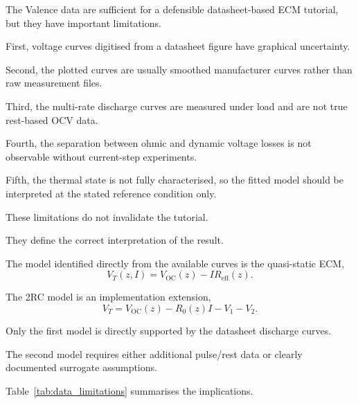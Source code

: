 \documentclass[a4paper,12pt]{article}
\begin{document}
The Valence data are sufficient for a defensible datasheet-based ECM tutorial, but they have important limitations.

First, voltage curves digitised from a datasheet figure have graphical uncertainty.

Second, the plotted curves are usually smoothed manufacturer curves rather than raw measurement files.

Third, the multi-rate discharge curves are measured under load and are not true rest-based OCV data.

Fourth, the separation between ohmic and dynamic voltage losses is not observable without current-step experiments.

Fifth, the thermal state is not fully characterised, so the fitted model should be interpreted at the stated reference condition only.

These limitations do not invalidate the tutorial.

They define the correct interpretation of the result.

The model identified directly from the available curves is the quasi-static ECM,
\begin{equation}
V_T(z,I)
=
V_{\mathrm{OC}}(z)
-
IR_{\mathrm{eff}}(z).
\label{eq:data_directly_supported_model}
\end{equation}

The 2RC model is an implementation extension,
\begin{equation}
V_T
=
V_{\mathrm{OC}}(z)
-
R_0(z)I
-
V_1
-
V_2.
\label{eq:data_surrogate_dynamic_model}
\end{equation}

Only the first model is directly supported by the datasheet discharge curves.

The second model requires either additional pulse/rest data or clearly documented surrogate assumptions.

Table~\ref{tab:data_limitations} summarises the implications.
\end{document}
